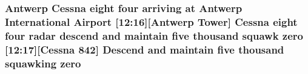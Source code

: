 \subsubsection[{\texorpdfstring{zero}{zero}}]{\setlength{\rightskip}{0pt plus 5cm}Antwerp {\bf Cessna} eight four arriving at Antwerp International {\bf Airport} \mbox{[}12\+:16\mbox{]}\mbox{[}Antwerp {\bf Tower}\mbox{]} {\bf Cessna} eight four radar descend and maintain five {\bf thousand} squawk zero \mbox{[}12\+:17\mbox{]}\mbox{[}{\bf Cessna} 842\mbox{]} Descend and maintain five {\bf thousand} {\bf squawking} zero}\hypertarget{happyDay1ATC_8txt_adce466d7618784129bcb0feb6d2d98e4}{}\label{happyDay1ATC_8txt_adce466d7618784129bcb0feb6d2d98e4}

